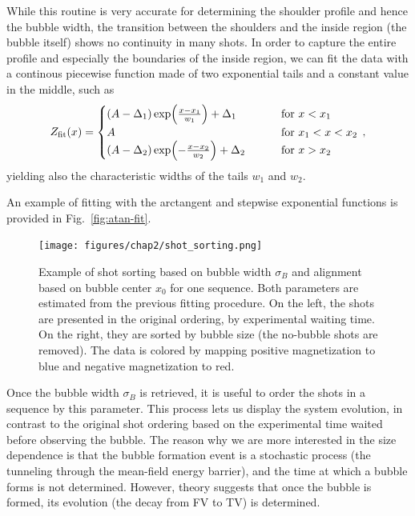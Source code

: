 While this routine is very accurate for determining the shoulder profile and hence the bubble width, the transition between the shoulders and the inside region (the bubble itself) shows no continuity in many shots. In order to capture the entire profile and especially the boundaries of the inside region, we can fit the data with a continous piecewise function made of two exponential tails and a constant value in the middle, such as
\begin{equation}
    Z_{\rm fit}(x) = 
    \begin{cases}
        (A-\Delta_1) \exp(\frac{x-x_1}{w_1}) + \Delta_1 \qquad\quad &\text{for } x < x_1\\
        A \qquad\qquad\qquad\qquad &\text{for } x_1 < x < x_2\\
        (A-\Delta_2) \exp(-\frac{x-x_2}{w_2}) + \Delta_2 \qquad &\text{for } x > x_2
    \end{cases}\, ,
    \label{eq:fit_exp}
\end{equation}
yielding also the characteristic widths of the tails $w_1$ and $w_2$.

An example of fitting with the arctangent and stepwise exponential functions is provided in Fig.\ \ref{fig:atan-fit}.

\begin{figure}[t!]
    \centering
    \texttt{[image: figures/chap2/shot\_sorting.png]}
    \caption{Example of shot sorting based on bubble width $\sigma_B$ and alignment based on bubble center $x_0$ for one sequence. Both parameters are estimated from the previous fitting procedure. On the left, the shots are presented in the original ordering, by experimental waiting time. On the right, they are sorted by bubble size (the no-bubble shots are removed). The data is colored by mapping positive magnetization to blue and negative magnetization to red.}
    \label{fig:sorting}
\end{figure}

Once the bubble width $\sigma_B$ is retrieved, it is useful to order the shots in a sequence by this parameter. This process lets us display the system evolution, in contrast to the original shot ordering based on the experimental time waited before observing the bubble. The reason why we are more interested in the size dependence is that the bubble formation event is a stochastic process (the tunneling through the mean-field energy barrier), and the time at which a bubble forms is not determined. However, theory suggests that once the bubble is formed, its evolution (the decay from FV to TV) is determined. 

